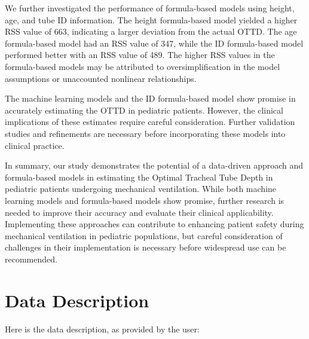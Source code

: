 \documentclass[11pt]{article}
\begin{document}
We further investigated the performance of formula-based models using height, age, and tube ID information. The height formula-based model yielded a higher RSS value of 663, indicating a larger deviation from the actual OTTD. The age formula-based model had an RSS value of 347, while the ID formula-based model performed better with an RSS value of 489. The higher RSS values in the formula-based models may be attributed to oversimplification in the model assumptions or unaccounted nonlinear relationships.

The machine learning models and the ID formula-based model show promise in accurately estimating the OTTD in pediatric patients. However, the clinical implications of these estimates require careful consideration. Further validation studies and refinements are necessary before incorporating these models into clinical practice.

In summary, our study demonstrates the potential of a data-driven approach and formula-based models in estimating the Optimal Tracheal Tube Depth in pediatric patients undergoing mechanical ventilation. While both machine learning models and formula-based models show promise, further research is needed to improve their accuracy and evaluate their clinical applicability. Implementing these approaches can contribute to enhancing patient safety during mechanical ventilation in pediatric populations, but careful consideration of challenges in their implementation is necessary before widespread use can be recommended.


\clearpage
\appendix

\section{Data Description} \label{sec:data_description} Here is the data description, as provided by the user:
\end{document}
